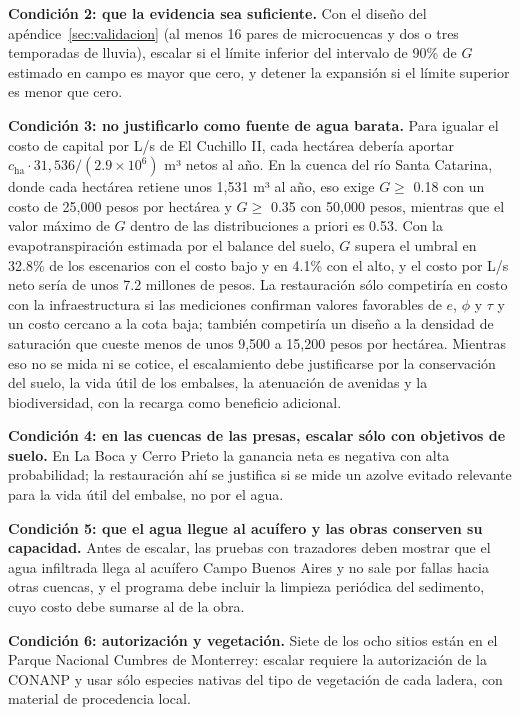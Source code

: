 \documentclass[11pt,letterpaper]{article}
\begin{document}
\textbf{Condición 2: que la evidencia sea suficiente.} Con el diseño del apéndice~\ref{sec:validacion} (al menos 16 pares de microcuencas y dos o tres temporadas de lluvia), escalar si el límite inferior del intervalo de 90\% de $G$ estimado en campo es mayor que cero, y detener la expansión si el límite superior es menor que cero.

\textbf{Condición 3: no justificarlo como fuente de agua barata.} Para igualar el costo de capital por L/s de El Cuchillo II, cada hectárea debería aportar $c_{\text{ha}}\cdot 31{,}536/(2.9\times10^6)$ m³ netos al año. En la cuenca del río Santa Catarina, donde cada hectárea retiene unos 1,531 m³ al año, eso exige $G\ge$ 0.18 con un costo de 25,000 pesos por hectárea y $G\ge$ 0.35 con 50,000 pesos, mientras que el valor máximo de $G$ dentro de las distribuciones a priori es 0.53. Con la evapotranspiración estimada por el balance del suelo, $G$ supera el umbral en 32.8\% de los escenarios con el costo bajo y en 4.1\% con el alto, y el costo por L/s neto sería de unos 7.2 millones de pesos. La restauración sólo competiría en costo con la infraestructura si las mediciones confirman valores favorables de $e$, $\phi$ y $\tau$ y un costo cercano a la cota baja; también competiría un diseño a la densidad de saturación que cueste menos de unos 9,500 a 15,200 pesos por hectárea. Mientras eso no se mida ni se cotice, el escalamiento debe justificarse por la conservación del suelo, la vida útil de los embalses, la atenuación de avenidas y la biodiversidad, con la recarga como beneficio adicional.

\textbf{Condición 4: en las cuencas de las presas, escalar sólo con objetivos de suelo.} En La Boca y Cerro Prieto la ganancia neta es negativa con alta probabilidad; la restauración ahí se justifica si se mide un azolve evitado relevante para la vida útil del embalse, no por el agua.

\textbf{Condición 5: que el agua llegue al acuífero y las obras conserven su capacidad.} Antes de escalar, las pruebas con trazadores deben mostrar que el agua infiltrada llega al acuífero Campo Buenos Aires y no sale por fallas hacia otras cuencas, y el programa debe incluir la limpieza periódica del sedimento, cuyo costo debe sumarse al de la obra.

\textbf{Condición 6: autorización y vegetación.} Siete de los ocho sitios están en el Parque Nacional Cumbres de Monterrey: escalar requiere la autorización de la CONANP y usar sólo especies nativas del tipo de vegetación de cada ladera, con material de procedencia local.
\end{document}
